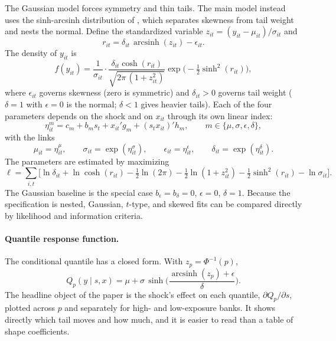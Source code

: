 \documentclass[11pt]{article}
\newcommand{\asinh}{\operatorname{arcsinh}}
\begin{document}
The Gaussian model forces symmetry and thin tails. The main model instead uses the sinh-arcsinh distribution of \citet{jones2009}, which separates skewness from tail weight and nests the normal. Define the standardized variable $z_{it}=(y_{it}-\mu_{it})/\sigma_{it}$ and
\[
  r_{it}=\delta_{it}\,\asinh(z_{it})-\epsilon_{it}.
\]
The density of $y_{it}$ is
\begin{equation}
  f(y_{it})=\frac{1}{\sigma_{it}}\cdot\frac{\delta_{it}\cosh(r_{it})}{\sqrt{2\pi\,(1+z_{it}^2)}}\exp\!\Big(-\tfrac12\sinh^2(r_{it})\Big), \label{eq:shash}
\end{equation}
where $\epsilon_{it}$ governs skewness (zero is symmetric) and $\delta_{it}>0$ governs tail weight ($\delta=1$ with $\epsilon=0$ is the normal; $\delta<1$ gives heavier tails). Each of the four parameters depends on the shock and on $x_{it}$ through its own linear index:
\begin{equation}
  \eta^{m}_{it}=c_m+b_m s_t+x_{it}'g_m+(s_t x_{it})'h_m,\qquad m\in\{\mu,\sigma,\epsilon,\delta\}, \label{eq:index}
\end{equation}
with the links
\[
  \mu_{it}=\eta^{\mu}_{it},\qquad \sigma_{it}=\exp(\eta^{\sigma}_{it}),\qquad \epsilon_{it}=\eta^{\epsilon}_{it},\qquad \delta_{it}=\exp(\eta^{\delta}_{it}).
\]
The parameters are estimated by maximizing
\begin{equation}
  \ell=\sum_{i,t}\Big[\ln\delta_{it}+\ln\cosh(r_{it})-\tfrac12\ln(2\pi)-\tfrac12\ln(1+z_{it}^2)-\tfrac12\sinh^2(r_{it})-\ln\sigma_{it}\Big]. \label{eq:ll}
\end{equation}
The Gaussian baseline is the special case $b_\epsilon=b_\delta=0$, $\epsilon=0$, $\delta=1$. Because the specification is nested, Gaussian, $t$-type, and skewed fits can be compared directly by likelihood and information criteria.

\paragraph{Quantile response function.} The conditional quantile has a closed form. With $z_p=\Phi^{-1}(p)$,
\begin{equation}
  Q_p(y\mid s,x)=\mu+\sigma\,\sinh\!\Big(\frac{\asinh(z_p)+\epsilon}{\delta}\Big). \label{eq:quantile}
\end{equation}
The headline object of the paper is the shock's effect on each quantile, $\partial Q_p/\partial s$, plotted across $p$ and separately for high- and low-exposure banks. It shows directly which tail moves and how much, and it is easier to read than a table of shape coefficients.
\end{document}
